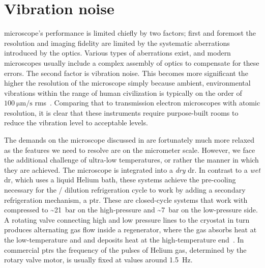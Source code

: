 \chapter{Vibration noise}\label{ch:setup:vibrations}
 microscope's performance is limited chiefly by two factors; first and foremost the resolution and imaging fidelity are limited by the systematic aberrations introduced by the optics.
Various types of aberrations exist, and modern microscopes usually include a complex assembly of optics to compensate for these errors.
The second factor is vibration noise.
This becomes more significant the higher the resolution of the microscope simply because ambient, environmental vibrations within the range of human civilization is typically on the order of $\qty{100}{\micro\meter\per\second}$ \gls{rms}~\cite{Gordon1999}.
Comparing that to transmission electron microscopes with atomic resolution, it is clear that these instruments require purpose-built rooms to reduce the vibration level to acceptable levels.

The demands on the microscope discussed in \thethesis are fortunately much more relaxed as the features we need to resolve are on the micrometer scale.
However, we face the additional challenge of ultra-low temperatures, or rather the manner in which they are achieved.
The microscope is integrated into a \emph{dry} \gls{dr}.
In contrast to a \emph{wet} \gls{dr}, which uses a liquid Helium bath, these systems achieve the pre-cooling necessary for the / dilution refrigeration cycle to work by adding a secondary refrigeration mechanism, a \gls{ptr}.
These are closed-cycle systems that work with  compressed to \textasciitilde\qty{21}{\bar} on the high-pressure and \textasciitilde\qty{7}{\bar} on the low-pressure side.
A rotating valve connecting high and low pressure lines to the cryostat in turn produces alternating gas flow inside a regenerator, where the gas absorbs heat at the low-temperature and and deposits heat at the high-temperature end~\cite{Radebaugh2009,DeWaele2011}.
In commercial \glspl{ptr} the frequency of the pulses of Helium gas, determined by the rotary valve motor, is usually fixed at values around \qty{1.5}{\hertz}.

